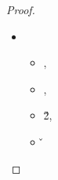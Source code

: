 \begin{lemma}
\begin{proof}
\begin{case}[T-App]









\begin{itemize}
  \item[]
\begin{subcase}[B-BetaClosure]
  \ 

  \begin{itemize}
    \item
  \opsem{\openv{}}{\e{}}{\v{}},
    \item
  \opsem {\openv{}}
         {}
         { {\abs {\x{}} {\s{}} {}}},
    \item
  \opsem {\openv{}}
         {}
         {\v{2}},
    \item
         {}
         {\v{}}
     \end{itemize}


\end{subcase}
\end{itemize}
\end{case}
\end{proof}
\end{lemma}
